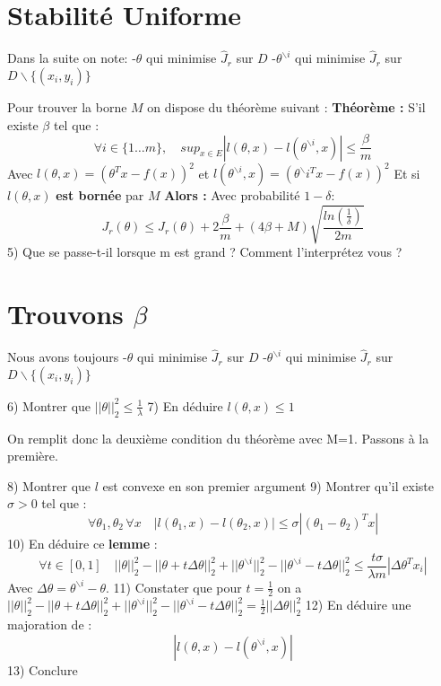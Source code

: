 \documentclass[12pt]{article}
\begin{document}
\section{ Stabilité Uniforme }   
Dans la suite on note:   
-$\theta$ qui minimise $\hat{J}_r$ sur $D$   
-$\theta^{ \backslash i}$  qui minimise $\hat{J}_r$ sur $D \backslash \{(x_i,y_i)\}$       
     
Pour trouver la borne $M$ on dispose du théorème suivant :   
\textbf{Théorème :} S'il existe $\beta$ tel que :  
$$ \forall i \in \{1 \dots m \},  \quad sup_{x \in E} |l(\theta,x)-l(\theta^{ \backslash i},x)| \leq \frac{\beta}{m}$$   
Avec $l(\theta,x) = (\theta^{T} x - f(x))^2$ et    $l(\theta^{\backslash i},x) = (\theta^\backslash{i}^{T} x - f(x))^2$    
Et si $l(\theta,x)$ \textbf{est bornée} par $M$  
\textbf{Alors :}    
Avec probabilité $1-\delta$:     
$$ J_r(\theta) \leq \hat{J}_r(\theta) + 2 \frac{\beta}{m} + (4\beta + M)\sqrt{\frac{ln(\frac{1}{\delta})}{2m}} $$   
5) Que se passe-t-il lorsque m est grand ? Comment l'interprétez vous ?
\newpage
\section{Trouvons $\beta$}
Nous avons toujours    
-$\theta$ qui minimise $\hat{J}_r$ sur $D$   
-$\theta^{ \backslash i}$  qui minimise $\hat{J}_r$ sur $D \backslash \{(x_i,y_i)\}$        
     
6) Montrer que $||\theta||^2_2 \leq \frac{1}{\lambda}$    
7) En déduire $l(\theta,x) \leq 1$      
    
On remplit donc la deuxième condition du théorème avec M=1.    
Passons à la première.   
    
8) Montrer que $l$ est convexe en son premier argument   
9) Montrer qu'il existe $\sigma > 0$ tel que :
$$ \forall \theta_1,\theta_2 \, \forall x \quad |l(\theta_1,x)-l(\theta_2,x)| \leq \sigma |(\theta_1 - \theta_2)^T x|$$      
10) En déduire ce \textbf{lemme} :      
$$ \forall t \in [0,1] \quad ||\theta||^2_2 - ||\theta + t \Delta \theta||_2^2 + ||\theta^{ \backslash i}||_2^2 - ||\theta^{ \backslash i} - t \Delta \theta||_2^2 \leq \frac{t \sigma}{\lambda m}|\Delta \theta^T x_i| $$   
Avec $\Delta \theta = \theta^{ \backslash i} - \theta$.    
11) Constater que pour $t=\frac{1}{2}$ on a $||\theta||^2_2 - ||\theta + t \Delta \theta||_2^2 + ||\theta^{ \backslash i}||_2^2 - ||\theta^{ \backslash i} - t \Delta \theta||_2^2 = \frac{1}{2}||\Delta \theta||^2_2$   
12) En déduire une majoration de : 
$$ |l(\theta,x)-l(\theta^{ \backslash i},x)| $$    
13) Conclure
\end{document}
